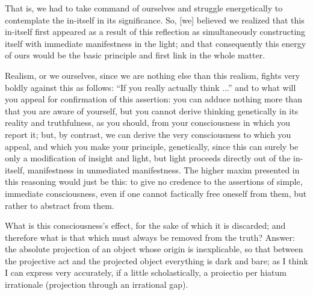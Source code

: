That is, we had to take command of ourselves
and struggle energetically to contemplate
the in-itself in its significance.
So, [we] believed we realized that this in-itself first appeared
as a result of this reflection as
simultaneously constructing itself with
immediate manifestness in the light;
and that consequently this energy of ours would be
the basic principle and first link in the whole matter.

Realism, or we ourselves, since we are nothing else than this realism,
fights very boldly against this as follows:
“If you really actually think ...”
and to what will you appeal for confirmation of this assertion:
you can adduce nothing more than that you are aware of yourself,
but you cannot derive thinking genetically in its reality and truthfulness,
as you should, from your consciousness in which you report it;
but, by contrast, we can derive the very consciousness to which you appeal,
and which you make your principle, genetically,
since this can surely be only a modification of insight and light,
but light proceeds directly out of the in-itself,
manifestness in unmediated manifestness.
The higher maxim presented in this reasoning would just be this:
to give no credence to the assertions
of simple, immediate consciousness,
even if one cannot factically free oneself from them,
but rather to abstract from them.

What is this consciousness’s effect,
for the sake of which it is discarded;
and therefore what is that
which must always be removed from the truth?
Answer:
the absolute projection of an object
whose origin is inexplicable,
so that between the projective act
and the projected object
everything is dark and bare;
as I think I can express very accurately,
if a little scholastically,
a proiectio per hiatum irrationale
(projection through an irrational gap).

